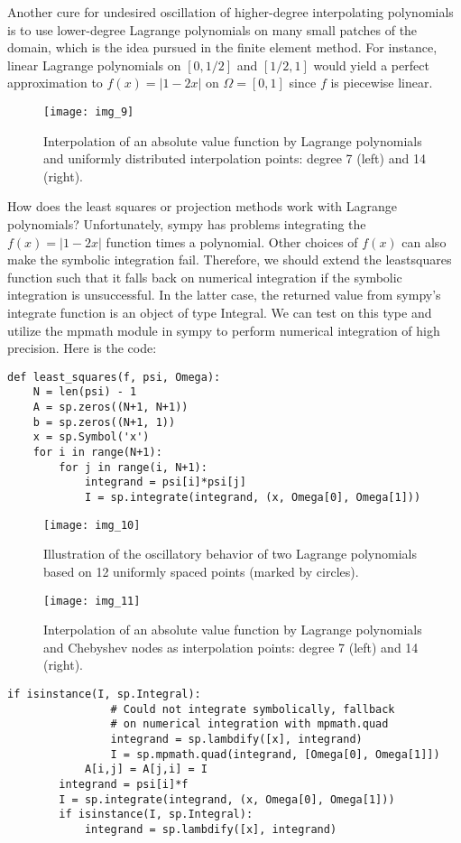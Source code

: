 \documentclass[../main.tex]{subfiles}
\begin{document}
Another cure for undesired oscillation of higher-degree interpolating polynomials is to use lower-degree Lagrange polynomials on many small patches of the domain, which is the idea pursued in the finite element method. For instance, linear Lagrange polynomials on $[0,1 / 2]$ and $[1 / 2,1]$ would yield a perfect approximation to $f(x)=|1-2 x|$ on $\Omega=[0,1]$ since $f$ is piecewise linear.
\begin{figure}[H]
	\centering
	\texttt{[image: img\_9]}
	\caption{Interpolation of an absolute value function by Lagrange polynomials and uniformly distributed interpolation points: degree 7 (left) and 14 (right).}
	\label{fig:img_9}
\end{figure}
How does the least squares or projection methods work with Lagrange polynomials? Unfortunately, sympy has problems integrating the $f(x)=|1-2 x|$ function times a polynomial. Other choices of $f(x)$ can also make the symbolic integration fail. Therefore, we should extend the least\textunderscore squares function such that it falls back on numerical integration if the symbolic integration is unsuccessful. In the latter case, the returned value from sympy's integrate function is an object of type Integral. We can test on this type and utilize the mpmath module in sympy to perform numerical integration of high precision. Here is the code:
\begin{lstlisting}[numbers=none]
def least_squares(f, psi, Omega):
	N = len(psi) - 1
	A = sp.zeros((N+1, N+1))
	b = sp.zeros((N+1, 1))
	x = sp.Symbol('x')
	for i in range(N+1):
		for j in range(i, N+1):
			integrand = psi[i]*psi[j]
			I = sp.integrate(integrand, (x, Omega[0], Omega[1]))	
\end{lstlisting}
\begin{figure}[H]
	\centering
	\texttt{[image: img\_10]}
	\caption{Illustration of the oscillatory behavior of two Lagrange polynomials
		based on 12 uniformly spaced points (marked by circles).}
	\label{fig:img_10}
\end{figure}
\begin{figure}[H]
	\centering
	\texttt{[image: img\_11]}
	\caption{ Interpolation of an absolute value function by Lagrange polynomials
		and Chebyshev nodes as interpolation points: degree 7 (left) and 14 (right).}
	\label{fig:img_11}
\end{figure}
\begin{lstlisting}[numbers=none]
			if isinstance(I, sp.Integral):
				# Could not integrate symbolically, fallback
				# on numerical integration with mpmath.quad
				integrand = sp.lambdify([x], integrand)
				I = sp.mpmath.quad(integrand, [Omega[0], Omega[1]])
			A[i,j] = A[j,i] = I
		integrand = psi[i]*f
		I = sp.integrate(integrand, (x, Omega[0], Omega[1]))
		if isinstance(I, sp.Integral):
			integrand = sp.lambdify([x], integrand)
\end{lstlisting}
\end{document}

